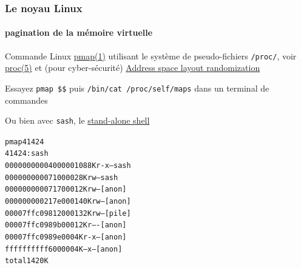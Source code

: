 \documentclass[xcolor=svgnames,final,smaller,a4]{beamer}
\begin{document}
\begin{frame}
  \frametitle{Le noyau Linux}
  \framesubtitle{pagination de la mémoire virtuelle}

  Commande Linux
  \href{https://man7.org/linux/man-pages/man1/pmap.1.html}{pmap(1)}
  utilisant le système de pseudo-fichiers \texttt{/proc/}, voir
  \href{https://man7.org/linux/man-pages/man5/proc.5.html}{proc(5)} et (pour cyber-sécurité) \href{https://fr.wikipedia.org/wiki/Address_space_layout_randomization}{Address space layout randomization}

  Essayez \texttt{pmap \$\$} puis \texttt{/bin/cat /proc/self/maps} dans un terminal de commandes

  Ou bien avec \texttt{sash}, le \href{https://en.wikipedia.org/wiki/Stand-alone_shell}{stand-alone shell}

      \begin{alltt}
    pmap 41424\\
    41424:   sash\\
    0000000000400000   1088K r-x-- sash\\
    0000000000710000     28K rw--- sash\\
    0000000000717000     12K rw---   [ anon ]\\
    000000000217e000    140K rw---   [ anon ]\\
    00007ffc09812000    132K rw---   [ pile  ]\\
    00007ffc0989b000     12K r----   [ anon ]\\
    00007ffc0989e000      4K r-x--   [ anon ]\\
    ffffffffff600000      4K --x--   [ anon ]\\
     total             1420K
      \end{alltt}
  
\end{frame}
\end{document}
